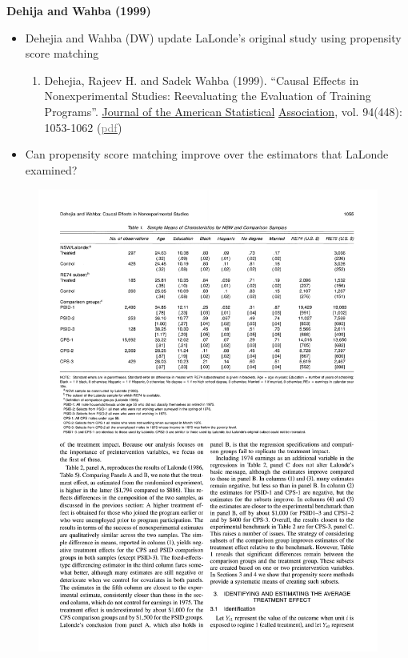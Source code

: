 \documentclass[notes=show]{beamer}
\newcommand{\myurlshort}[2]{\href{#1}{\textcolor{gray}{\textsf{#2}}}}
\begin{document}
\begin{frame}[plain]
	\begin{center}
	\textbf{Dehija and Wahba (1999)}
	\end{center}
	
	\begin{itemize}
	\item Dehejia and Wahba (DW) update LaLonde's original study using propensity score matching
		\begin{enumerate}
		\item Dehejia, Rajeev H. and Sadek Wahba (1999). 	``Causal Effects in Nonexperimental Studies: Reevaluating the Evaluation of Training Programs''. \underline{Journal of the American Statistical} \underline{Association}, vol. 94(448): 1053-1062 (\myurlshort{http://business.baylor.edu/scott_cunningham/teaching/dehejia-and-wahba-1999.pdf}{pdf})
		\end{enumerate}
	\item Can propensity score matching improve over the estimators that LaLonde examined?
	\end{itemize}
\end{frame}

\begin{frame}[plain]
	
\begin{figure}
\includegraphics[scale=0.5]{./lecture_includes/dw_1.pdf}
\end{figure}

\end{frame}
\end{document}
